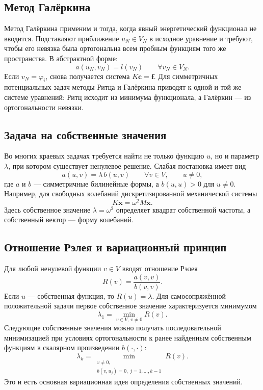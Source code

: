 \subsection{Метод Галёркина}

Метод Галёркина применим и тогда, когда явный энергетический функционал не
вводится. Подставляют приближение $u_N\in V_N$ в исходное уравнение и требуют,
чтобы его невязка была ортогональна всем пробным функциям того же пространства.
В абстрактной форме:
\[
    a(u_N,v_N)=l(v_N)
    \qquad \forall v_N\in V_N.
\]
Если $v_N=\varphi_i$, снова получается система $K\mathbf c=\mathbf f$.
Для симметричных потенциальных задач методы Ритца и Галёркина приводят к одной
и той же системе уравнений: Ритц исходит из минимума функционала, а Галёркин
--- из ортогональности невязки.

\subsection{Задача на собственные значения}

Во многих краевых задачах требуется найти не только функцию $u$, но и параметр
$\lambda$, при котором существует ненулевое решение. Слабая постановка имеет
вид
\[
    a(u,v)=\lambda\,b(u,v)
    \qquad \forall v\in V,
    \qquad u\neq0,
\]
где $a$ и $b$ --- симметричные билинейные формы, а $b(u,u)>0$ для $u\neq0$.
Например, для свободных колебаний дискретизированной механической системы
\[
    K\mathbf x=\omega^2 M\mathbf x.
\]
Здесь собственное значение $\lambda=\omega^2$ определяет квадрат собственной
частоты, а собственный вектор --- форму колебаний.

\subsection{Отношение Рэлея и вариационный принцип}

Для любой ненулевой функции $v\in V$ вводят отношение Рэлея
\[
    R(v)=\frac{a(v,v)}{b(v,v)}.
\]
Если $u$ --- собственная функция, то $R(u)=\lambda$. Для самосопряжённой
положительной задачи первое собственное значение характеризуется минимумом
\[
    \lambda_1=\min_{v\in V,\,v\neq0}R(v).
\]
Следующие собственные значения можно получать последовательной минимизацией
при условиях ортогональности к ранее найденным собственным функциям в
скалярном произведении $b(\cdot,\cdot)$:
\[
    \lambda_k=
    \min_{\substack{v\neq0,\\
    b(v,u_j)=0,\;j=1,\ldots,k-1}}R(v).
\]
Это и есть основная вариационная идея определения собственных значений.

